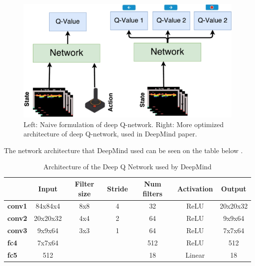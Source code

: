 \begin{figure}[H]
	\centering
	\includegraphics[width=1\textwidth]{Figures/Architecture/DQN/DQN_two_approach.pdf}
	\caption{Left: Naive formulation of deep Q-network. Right: More optimized architecture of deep Q-network, used in DeepMind paper.} 
	\label{fig:DQN_two_approach}
\end{figure}    

The network architecture that DeepMind used can be seen on the table below . 

\begin{table}[H]
	\centering
	\caption{Architecture of the Deep Q Network used by DeepMind}
	\label{tab:DQN_network}
	\begin{tabular}{|l|c|c|c|c|c|c|}
		\hline
		\rowcolor[HTML]{9B9B9B} 
		\multicolumn{1}{|c|}{\cellcolor[HTML]{9B9B9B}\textbf{Layer}} & \textbf{Input} & \textbf{Filter size} & \textbf{Stride} & \textbf{Num filters} & \textbf{Activation} & \textbf{Output} \\ \hline
		\cellcolor[HTML]{FFFFFF}\textbf{conv1}                       & 84x84x4        & 8x8                  & 4               & 32                   & ReLU                & 20x20x32        \\ \hline
		\rowcolor[HTML]{C0C0C0} 
		\textbf{conv2}                                               & 20x20x32       & 4x4                  & 2               & 64                   & ReLU                & 9x9x64          \\ \hline
		\cellcolor[HTML]{FFFFFF}\textbf{conv3}                       & 9x9x64         & 3x3                  & 1               & 64                   & ReLU                & 7x7x64          \\ \hline
		\rowcolor[HTML]{C0C0C0} 
		\textbf{fc4}                                                 & 7x7x64         &                      &                 & 512                  & ReLU                & 512             \\ \hline
		\cellcolor[HTML]{FFFFFF}\textbf{fc5}                         & 512            &                      &                 & 18                   & Linear              & 18              \\ \hline
	\end{tabular}
\end{table}


        